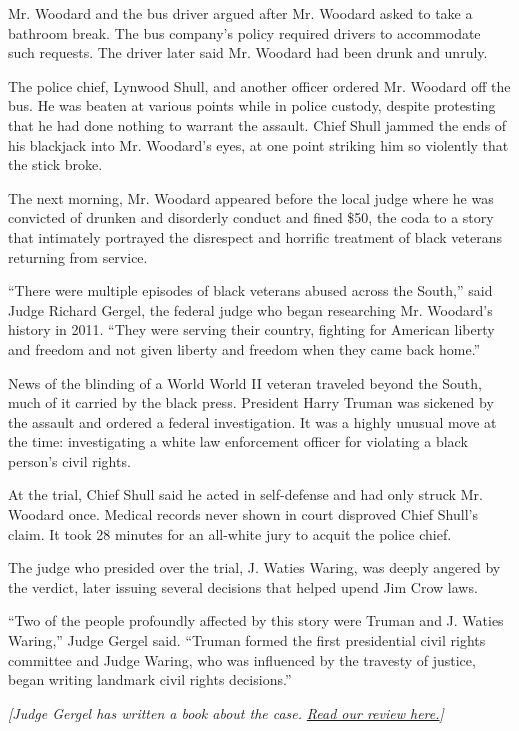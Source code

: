 Mr. Woodard and the bus driver argued after Mr. Woodard asked to take a
bathroom break. The bus company's policy required drivers to accommodate
such requests. The driver later said Mr. Woodard had been drunk and
unruly.

The police chief, Lynwood Shull, and another officer ordered Mr. Woodard
off the bus. He was beaten at various points while in police custody,
despite protesting that he had done nothing to warrant the assault.
Chief Shull jammed the ends of his blackjack into Mr. Woodard's eyes, at
one point striking him so violently that the stick broke.

The next morning, Mr. Woodard appeared before the local judge where he
was convicted of drunken and disorderly conduct and fined \$50, the coda
to a story that intimately portrayed the disrespect and horrific
treatment of black veterans returning from service.

``There were multiple episodes of black veterans abused across the
South,'' said Judge Richard Gergel, the federal judge who began
researching Mr. Woodard's history in 2011. ``They were serving their
country, fighting for American liberty and freedom and not given liberty
and freedom when they came back home.''

News of the blinding of a World World II veteran traveled beyond the
South, much of it carried by the black press. President Harry Truman was
sickened by the assault and ordered a federal investigation. It was a
highly unusual move at the time: investigating a white law enforcement
officer for violating a black person's civil rights.

At the trial, Chief Shull said he acted in self-defense and had only
struck Mr. Woodard once. Medical records never shown in court disproved
Chief Shull's claim. It took 28 minutes for an all-white jury to acquit
the police chief.

The judge who presided over the trial, J. Waties Waring, was deeply
angered by the verdict, later issuing several decisions that helped
upend Jim Crow laws.

``Two of the people profoundly affected by this story were Truman and J.
Waties Waring,'' Judge Gergel said. ``Truman formed the first
presidential civil rights committee and Judge Waring, who was influenced
by the travesty of justice, began writing landmark civil rights
decisions.''

\emph{{[}Judge Gergel has written a book about the case.}
\href{https://www.nytimes.com/2019/02/07/books/review/richard-gergel-unexampled-courage.html}{\emph{Read
our review here.}}\emph{{]}}

